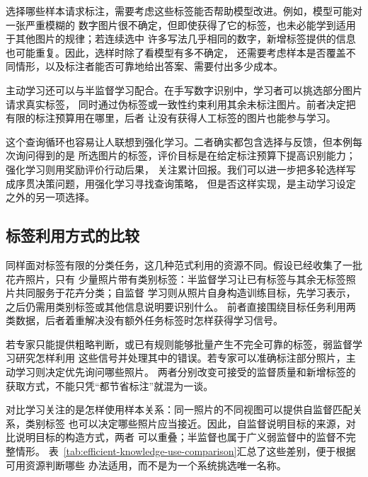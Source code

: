 选择哪些样本请求标注，需要考虑这些标签能否帮助模型改进。例如，模型可能对一张严重模糊的
数字图片很不确定，但即使获得了它的标签，也未必能学到适用于其他图片的规律；若连续选中
许多写法几乎相同的数字，新增标签提供的信息也可能重复。因此，选样时除了看模型有多不确定，
还需要考虑样本是否覆盖不同情形，以及标注者能否可靠地给出答案、需要付出多少成本。

主动学习还可以与半监督学习配合。在手写数字识别中，学习者可以挑选部分图片请求真实标签，
同时通过伪标签或一致性约束利用其余未标注图片。前者决定把有限的标注预算用在哪里，后者
让没有获得人工标签的图片也能参与学习。

这个查询循环也容易让人联想到强化学习。二者确实都包含选择与反馈，但本例每次询问得到的是
所选图片的标签，评价目标是在给定标注预算下提高识别能力；强化学习则用奖励评价行动后果，
关注累计回报。我们可以进一步把多轮选样写成序贯决策问题，用强化学习寻找查询策略，
但是否这样实现，是主动学习设定之外的另一项选择。

\subsection{标签利用方式的比较}
\label{sec:efficient-knowledge-use-comparison}

同样面对标签有限的分类任务，这几种范式利用的资源不同。假设已经收集了一批花卉照片，只有
少量照片带有类别标签：半监督学习让已有标签与其余无标签照片共同服务于花卉分类；自监督
学习则从照片自身构造训练目标，先学习表示，之后仍需用类别标签或其他信息说明要识别什么。
前者直接围绕目标任务利用两类数据，后者着重解决没有额外任务标签时怎样获得学习信号。

若专家只能提供粗略判断，或已有规则能够批量产生不完全可靠的标签，弱监督学习研究怎样利用
这些信号并处理其中的错误。若专家可以准确标注部分照片，主动学习则决定优先询问哪些照片。
两者分别改变可接受的监督质量和新增标签的获取方式，不能只凭“都节省标注”就混为一谈。

对比学习关注的是怎样使用样本关系：同一照片的不同视图可以提供自监督匹配关系，类别标签
也可以决定哪些照片应当接近。因此，自监督说明目标的来源，对比说明目标的构造方式，两者
可以重叠；半监督也属于广义弱监督中的监督不完整情形。
表~\ref{tab:efficient-knowledge-use-comparison}汇总了这些差别，便于根据可用资源判断哪些
办法适用，而不是为一个系统挑选唯一名称。

